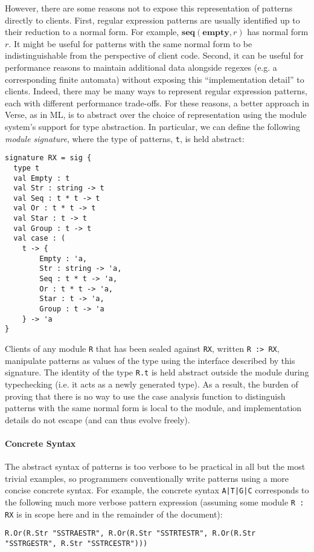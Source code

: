 However, there are some reasons not to expose this representation of patterns directly to clients. First, regular expression patterns are usually identified up to their reduction to a normal form. For example, $\textbf{seq}(\textbf{empty}, r)$ has normal form $r$. It might be useful for patterns with the same normal form to be  indistinguishable from the perspective of client code. Second, it can be useful for performance reasons to maintain additional data alongside regexes (e.g. a corresponding finite automata) without exposing this ``implementation detail'' to clients. Indeed, there may be many ways to represent regular expression patterns, each with different performance trade-offs. For these reasons, a better approach in Verse, as in ML, is to abstract over the choice of representation using  the module system's support for type abstraction. In particular, we can define the following \emph{module signature}, where the type of patterns, \lstinline{t}, is held abstract:

\begin{lstlisting}[deletekeywords={case},numbers=none]
signature RX = sig {
  type t
  val Empty : t
  val Str : string -> t
  val Seq : t * t -> t
  val Or : t * t -> t
  val Star : t -> t
  val Group : t -> t
  val case : (
    t -> {
    	Empty : 'a,
    	Str : string -> 'a,
    	Seq : t * t -> 'a,
    	Or : t * t -> 'a,
    	Star : t -> 'a,
    	Group : t -> 'a
    } -> 'a
}
\end{lstlisting}
 Clients of any module \lstinline{R} that has been sealed against \lstinline{RX}, written \lstinline{R :> RX}, manipulate patterns as values of the type  using the interface described by this signature. The identity of the type \lstinline{R.t} is held abstract outside the module during typechecking (i.e. it acts as a newly generated type). As a result, the burden of proving that there is no way to use the case analysis function to distinguish patterns with the same normal form is local to the module, and implementation details do not escape (and can thus evolve freely). %

\paragraph{Concrete Syntax} The abstract syntax of patterns is too verbose to be practical  in all but the most trivial examples, so programmers conventionally write patterns using a more concise concrete syntax. For example, the concrete syntax \lstinline{A|T|G|C} corresponds to the following much more verbose pattern expression (assuming some module \lstinline{R : RX} is in scope here and in the remainder of the document):
\begin{lstlisting}[numbers=none,mathescape=|]
R.Or(R.Str "SSTRAESTR", R.Or(R.Str "SSTRTESTR", R.Or(R.Str "SSTRGESTR", R.Str "SSTRCESTR")))
\end{lstlisting} 

